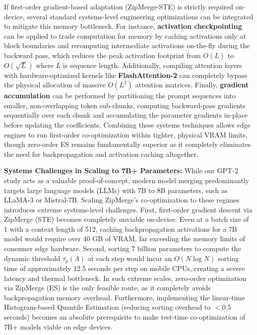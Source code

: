 If first-order gradient-based adaptation (ZipMerge-STE) is strictly required on-device, several standard systems-level engineering optimizations can be integrated to mitigate this memory bottleneck. For instance, \textbf{activation checkpointing} can be applied to trade computation for memory by caching activations only at block boundaries and recomputing intermediate activations on-the-fly during the backward pass, which reduces the peak activation footprint from $O(L)$ to $O(\sqrt{L})$ where $L$ is sequence length. Additionally, compiling attention layers with hardware-optimized kernels like \textbf{FlashAttention-2} can completely bypass the physical allocation of massive $O(L^2)$ attention matrices. Finally, \textbf{gradient accumulation} can be performed by partitioning the prompt sequences into smaller, non-overlapping token sub-chunks, computing backward-pass gradients sequentially over each chunk and accumulating the parameter gradients in-place before updating the coefficients. Combining these systems techniques allows edge engines to run first-order co-optimization within tighter, physical VRAM limits, though zero-order ES remains fundamentally superior as it completely eliminates the need for backpropagation and activation caching altogether.

\textbf{Systems Challenges in Scaling to 7B+ Parameters:} While our GPT-2 study acts as a valuable proof-of-concept, modern model merging predominantly targets large language models (LLMs) with 7B to 8B parameters, such as LLaMA-3 or Mistral-7B. Scaling ZipMerge's co-optimization to these regimes introduces extreme systems-level challenges. First, first-order gradient descent via ZipMerge (STE) becomes completely unviable on-device. Even at a batch size of 1 with a context length of 512, caching backpropagation activations for a 7B model would require over 40 GB of VRAM, far exceeding the memory limits of consumer edge hardware. Second, sorting 7 billion parameters to compute the dynamic threshold $\tau_p(\Lambda)$ at each step would incur an $O(N \log N)$ sorting time of approximately 12.5 seconds per step on mobile CPUs, creating a severe latency and thermal bottleneck. In such extreme scales, zero-order optimization via ZipMerge (ES) is the only feasible route, as it completely avoids backpropagation memory overhead. Furthermore, implementing the linear-time Histogram-based Quantile Estimation (reducing sorting overhead to $<0.5$ seconds) becomes an absolute prerequisite to make test-time co-optimization of 7B+ models viable on edge devices.

